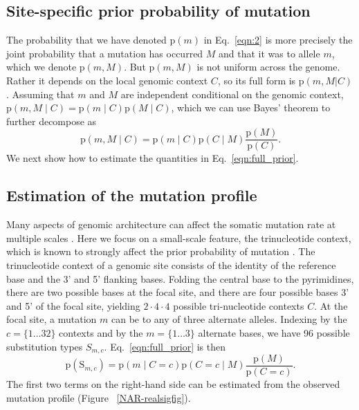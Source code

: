 \documentclass[a4,center,fleqn]{NAR}
\begin{document}
\subsection{Site-specific prior probability of mutation}
The probability that we have denoted $\mathrm{p}(m)$ in Eq.~\ref{eqn:2} is more precisely the joint probability that a mutation has occurred $M$ and that it was to allele $m$, which we denote $\mathrm{p}(m,M)$.
But $\mathrm{p}(m,M)$ is not uniform across the genome.
Rather it depends on the local genomic context $C$, so its full form is $\mathrm{p}(m,M | C)$ \cite{Buisson2019}.
Assuming that $m$ and $M$ are independent conditional on the genomic context, $\mathrm{p}(m,M \mid C) = \mathrm{p}(m \mid C) \mathrm{p}(M \mid C)$, which we can use Bayes' theorem to further decompose as 
\begin{equation}
  \label{eqn:full_prior}
  \mathrm{p}(m,M \mid C) = \mathrm{p}(m \mid C) \mathrm{p}(C \mid M)\frac{\mathrm{p}(M)}{\mathrm{p}(C)}.
\end{equation}
We next show how to estimate the quantities in Eq.~\ref{eqn:full_prior}.

\subsection{Estimation of the mutation profile}
Many aspects of genomic architecture can affect the somatic mutation rate at multiple scales \cite{Buisson2019}.
Here we focus on a small-scale feature, the trinucleotide context, which is known to strongly affect the prior probability of mutation \citep{Nik-Zainal2012a,Alexandrov2015,Lee-Six2018}.
The trinucleotide context of a genomic site consists of the identity of the reference base and the 3' and 5' flanking bases.
Folding the central base to the pyrimidines, there are two possible bases at the focal site, and there are four possible bases 3' and 5' of the focal site, yielding $2 \cdot 4 \cdot 4$ possible tri-nucleotide contexts $C$.
At the focal site, a mutation $m$ can be to any of three alternate alleles.
Indexing by the $c=\{1 \dots 32\}$ contexts and by the $m = \{1 \dots 3\}$ alternate bases, we have 96 possible substitution types $S_{m,c}$.
Eq.~\ref{eqn:full_prior} is then
\begin{equation}
  \label{eqn:detailed_prior}
  \mathrm{p}(\mathrm{S}_{m,c}) = \mathrm{p}(m \mid C = c) \mathrm{p}(C = c \mid M)\frac{\mathrm{p}(M)}{\mathrm{p}(C = c)}.
\end{equation}
The first two terms on the right-hand side can be estimated from the observed mutation profile (Figure ~\ref{NAR-realsigfig}).
\end{document}
